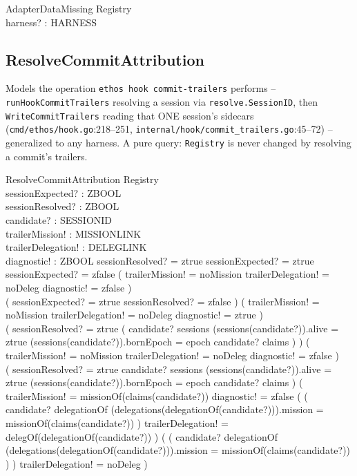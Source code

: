 \documentclass[a4paper,10pt,fleqn]{article}
\newcommand{\fpath}[1]{\texttt{#1}}
\newcommand{\field}[1]{\texttt{#1}}
\begin{document}
\begin{schema}{AdapterDataMissing}
\Xi Registry \\
harness? : HARNESS
\end{schema}

\subsection{ResolveCommitAttribution}
\label{sec:opresolve}

Models the operation \field{ethos hook commit-trailers} performs --
\field{runHookCommitTrailers} resolving a session via
\field{resolve.SessionID}, then \field{WriteCommitTrailers} reading that
ONE session's sidecars (\fpath{cmd/ethos/hook.go}:218--251,
\fpath{internal/hook/commit\_trailers.go}:45--72) -- generalized to any
harness. A pure query: \field{Registry} is never changed by resolving a
commit's trailers.

\begin{schema}{ResolveCommitAttribution}
\Xi Registry \\
sessionExpected? : ZBOOL \\
sessionResolved? : ZBOOL \\
candidate? : SESSIONID \\
trailerMission! : MISSIONLINK \\
trailerDelegation! : DELEGLINK \\
diagnostic! : ZBOOL
\where
sessionResolved? = ztrue \implies sessionExpected? = ztrue \\
sessionExpected? = zfalse \implies
  ( trailerMission! = noMission \land trailerDelegation! = noDeleg \land
    diagnostic! = zfalse ) \\
( sessionExpected? = ztrue \land sessionResolved? = zfalse ) \implies
  ( trailerMission! = noMission \land trailerDelegation! = noDeleg \land
    diagnostic! = ztrue ) \\
( sessionResolved? = ztrue \land
  \lnot ( candidate? \in \dom sessions \land
          (sessions(candidate?)).alive = ztrue \land
          (sessions(candidate?)).bornEpoch = epoch \land
          candidate? \in \dom claims ) ) \implies
  ( trailerMission! = noMission \land trailerDelegation! = noDeleg \land
    diagnostic! = zfalse ) \\
( sessionResolved? = ztrue \land
  candidate? \in \dom sessions \land
  (sessions(candidate?)).alive = ztrue \land
  (sessions(candidate?)).bornEpoch = epoch \land
  candidate? \in \dom claims ) \implies
  ( trailerMission! = missionOf(claims(candidate?)) \land
    diagnostic! = zfalse \land
    ( ( candidate? \in \dom delegationOf \land
        (delegations(delegationOf(candidate?))).mission = missionOf(claims(candidate?)) )
      \implies trailerDelegation! = delegOf(delegationOf(candidate?)) ) \land
    ( \lnot ( candidate? \in \dom delegationOf \land
              (delegations(delegationOf(candidate?))).mission = missionOf(claims(candidate?)) ) )
      \implies trailerDelegation! = noDeleg )
\end{schema}
\end{document}
